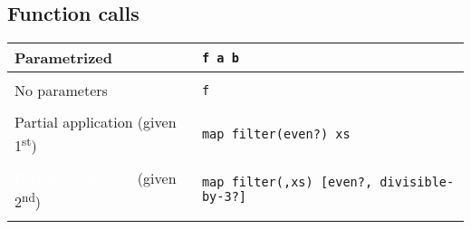 \documentclass[a4paper,12pt]{article}
\makeatletter
\newcommand{\code}{\lstinline}
\newcommand{\br}{\\ [0.5em] \hline \\ [-0.5em]}
\newenvironment{data}
    {
        \begin{center}
        \begin{tabular*}{\textwidth}{ l@{\extracolsep{\fill}}l }
    }
    {
        \end{tabular*}
        \end{center}
    }
\makeatother
\begin{document}
\subsection{Function calls}
\begin{data}
    Parametrized  &
        \code|f a b| \br
    No parameters &
        \code|f|     \br
    Partial application (given 1\textsuperscript{st}) &
        \code|map filter(even?) xs| \br
    \textcolor{white}{
    Partial application} (given 2\textsuperscript{nd}) &
        \code|map filter(,xs) [even?, divisible-by-3?]| \br
\end{data}



\newpage


\end{document}
